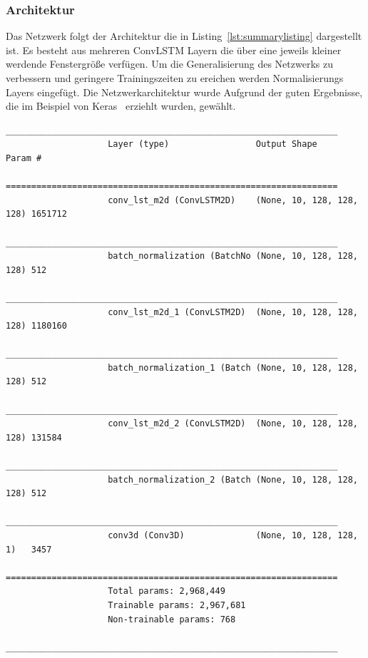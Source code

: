 \documentclass[12pt]{article}
\begin{document}
        \subsubsection{Architektur}
            Das Netzwerk folgt der Architektur die in Listing~\ref{lst:summarylisting} dargestellt ist. Es besteht aus mehreren ConvLSTM Layern die über eine jeweils kleiner werdende Fenstergröße verfügen.
            Um die Generalisierung des Netzwerks zu verbessern und geringere Trainingszeiten zu ereichen werden Normalisierungs Layers eingefügt. 
            Die Netzwerkarchitektur wurde Aufgrund der guten Ergebnisse, die im Beispiel von Keras~\cite{Keras2021} erziehlt wurden, gewählt.
            \begin{lstlisting}[caption=Ausgabe des model.summary() Aufrufs, label={lst:summarylisting}, basicstyle=\tiny, numbers=none]
                    _________________________________________________________________
                    Layer (type)                 Output Shape              Param #   
                    =================================================================
                    conv_lst_m2d (ConvLSTM2D)    (None, 10, 128, 128, 128) 1651712   
                    _________________________________________________________________
                    batch_normalization (BatchNo (None, 10, 128, 128, 128) 512       
                    _________________________________________________________________
                    conv_lst_m2d_1 (ConvLSTM2D)  (None, 10, 128, 128, 128) 1180160   
                    _________________________________________________________________
                    batch_normalization_1 (Batch (None, 10, 128, 128, 128) 512       
                    _________________________________________________________________
                    conv_lst_m2d_2 (ConvLSTM2D)  (None, 10, 128, 128, 128) 131584    
                    _________________________________________________________________
                    batch_normalization_2 (Batch (None, 10, 128, 128, 128) 512       
                    _________________________________________________________________
                    conv3d (Conv3D)              (None, 10, 128, 128, 1)   3457      
                    =================================================================
                    Total params: 2,968,449
                    Trainable params: 2,967,681
                    Non-trainable params: 768
                    _________________________________________________________________
            \end{lstlisting}
\end{document}
